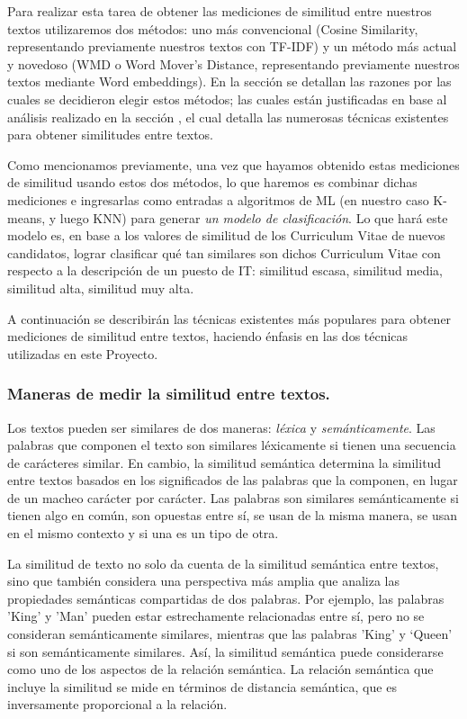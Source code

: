\documentclass[12pt,a4paper]{article}
\begin{document}
\begin{sloppypar}
Para realizar esta tarea de obtener las mediciones de similitud entre nuestros textos utilizaremos dos métodos: uno más convencional (Cosine Similarity, representando previamente nuestros textos con TF-IDF) y un método más actual y novedoso (WMD o Word Mover’s Distance, representando previamente nuestros textos mediante Word embeddings). En la sección \textit{} se detallan las razones por las cuales se decidieron elegir estos métodos; las cuales están justificadas en base al análisis realizado en la sección \textit{}, el cual detalla las numerosas técnicas existentes para obtener similitudes entre textos.

Como mencionamos previamente, una vez que hayamos obtenido estas mediciones de similitud usando estos dos métodos, lo que haremos es combinar dichas mediciones e ingresarlas como entradas a algoritmos de ML (en nuestro caso K-means, y luego KNN) para generar \textit{un modelo de clasificación}. Lo que hará este modelo es, en base a los valores de similitud de los Curriculum Vitae de nuevos candidatos, lograr clasificar qué tan similares son dichos Curriculum Vitae con respecto a la descripción de un puesto de IT: similitud escasa, similitud media, similitud alta, similitud muy alta.

A continuación se describirán las técnicas existentes más populares para obtener mediciones de similitud entre textos, haciendo énfasis en las dos técnicas utilizadas en este Proyecto. 
\\

\subsubsection{Maneras de medir la similitud entre textos.}\label{Tecnicas_Simil_textos}

Los textos pueden ser similares de dos maneras: \textit{léxica} y \textit{semánticamente}. Las palabras que componen el texto son similares léxicamente si tienen una secuencia de carácteres similar. En cambio, la similitud semántica determina la similitud entre textos basados en los significados de las palabras que la componen, en lugar de un macheo carácter por carácter. Las palabras son similares semánticamente si tienen algo en común, son opuestas entre sí, se usan de la misma manera, se usan en el mismo contexto y si una es un tipo de otra\cite{NLP_16}.

La similitud de texto no solo da cuenta de la similitud semántica entre textos, sino que también considera una perspectiva más amplia que analiza las propiedades semánticas compartidas de dos palabras. Por ejemplo, las palabras 'King' y 'Man' pueden estar estrechamente relacionadas entre sí, pero no se consideran semánticamente similares, mientras que las palabras 'King' y ‘Queen' si son semánticamente similares. Así, la similitud semántica puede considerarse como uno de los aspectos de la relación semántica. La relación semántica que incluye la similitud se mide en términos de distancia semántica, que es inversamente proporcional a la relación\cite{similarity_survey}.


\end{sloppypar}
\end{document}
